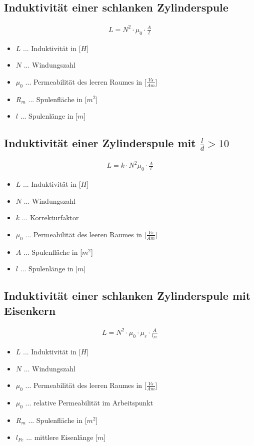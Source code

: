 \subsection{Induktivität einer schlanken Zylinderspule}
\begin{align}
    L=N^2\cdot\mu_0\cdot \frac{A}{l}
\end{align}
\begin{itemize}
    \item $L$ ... Induktivität in [$H$]
    \item $N$ ... Windungszahl
    \item $\mu_0$ ... Permeabilität des leeren Raumes in [$\frac{Vs}{Am}$]
    \item $R_m$ ... Spulenfläche in [$m^2$]
    \item $l$ ... Spulenlänge in [$m$]
\end{itemize}

\subsection{Induktivität einer Zylinderspule mit $\frac{l}{d}>10$}
\begin{align}
    L=k\cdot N^2 \mu_0 \cdot \frac{A}{l}
\end{align}
\begin{itemize}
    \item $L$ ... Induktivität in [$H$]
    \item $N$ ... Windungszahl
    \item $k$ ... Korrekturfaktor
    \item $\mu_0$ ... Permeabilität des leeren Raumes in [$\frac{Vs}{Am}$]
    \item $A$ ... Spulenfläche in [$m^2$]
    \item $l$ ... Spulenlänge in [$m$]
\end{itemize}

\subsection{Induktivität einer schlanken Zylinderspule mit Eisenkern}
\begin{align}
    L=N^2\cdot\mu_0\cdot\mu_r\cdot \frac{A}{l_{Fe}}
\end{align}
\begin{itemize}
    \item $L$ ... Induktivität in [$H$]
    \item $N$ ... Windungszahl
    \item $\mu_0$ ... Permeabilität des leeren Raumes in [$\frac{Vs}{Am}$]
    \item $\mu_0$ ... relative Permeabilität im Arbeitspunkt
    \item $R_m$ ... Spulenfläche in [$m^2$]
    \item $l_{Fe}$ ... mittlere Eisenlänge [$m$]
\end{itemize}


